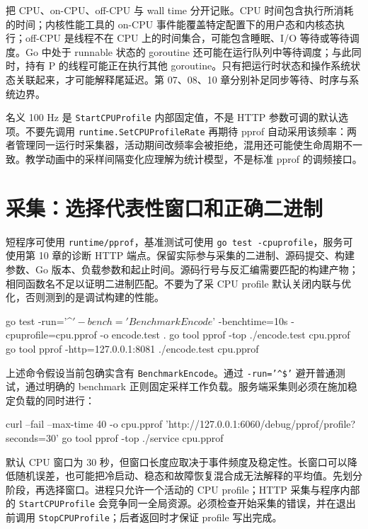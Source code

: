 \documentclass[UTF8,fontset=fandol,openany,11pt]{ctexbook}
\begin{document}
把 CPU、on-CPU、off-CPU 与 wall time 分开记账。CPU 时间包含执行所消耗的时间；内核性能工具的 on-CPU 事件能覆盖特定配置下的用户态和内核态执行；off-CPU 是线程不在 CPU 上的时间集合，可能包含睡眠、I/O 等待或等待调度。Go 中处于 runnable 状态的 goroutine 还可能在运行队列中等待调度；与此同时，持有 P 的线程可能正在执行其他 goroutine。只有把运行时状态和操作系统状态关联起来，才可能解释尾延迟。第 07、08、10 章分别补足同步等待、时序与系统边界。

名义 100 Hz 是 \texttt{StartCPUPr\allowbreak{}ofile} 内部固定值，不是 HTTP 参数可调的默认选项。不要先调用 \texttt{runtime.\allowbreak{}SetCPUProf\allowbreak{}ileRate} 再期待 pprof 自动采用该频率：两者管理同一运行时采集器，活动期间改频率会被拒绝，混用还可能使生命周期不一致。教学动画中的采样间隔变化应理解为统计模型，不是标准 pprof 的调频接口。

\section{采集：选择代表性窗口和正确二进制}
短程序可使用 \texttt{runtime/\allowbreak{}pprof}，基准测试可使用 \texttt{go test -\allowbreak{}cpuprofile}，服务可使用第 10 章的诊断 HTTP 端点。保留实际参与采集的二进制、源码提交、构建参数、Go 版本、负载参数和起止时间。源码行号与反汇编需要匹配的构建产物；相同函数名不足以证明二进制匹配。不要为了采 CPU profile 默认关闭内联与优化，否则测到的是调试构建的性能。

\begin{codeblock}
go test -run='^$' -bench='BenchmarkEncode$' -benchtime=10s   -cpuprofile=cpu.pprof -o encode.test .
go tool pprof -top ./encode.test cpu.pprof
go tool pprof -http=127.0.0.1:8081 ./encode.test cpu.pprof
\end{codeblock}

上述命令假设当前包确实含有 \texttt{BenchmarkE\allowbreak{}ncode}。通过 \texttt{-\allowbreak{}run='\textasciicircum{}\$'} 避开普通测试，通过明确的 benchmark 正则固定采样工作负载。服务端采集则必须在施加稳定负载的同时进行：

\begin{codeblock}
curl --fail --max-time 40 -o cpu.pprof   'http://127.0.0.1:6060/debug/pprof/profile?seconds=30'
go tool pprof -top ./service cpu.pprof
\end{codeblock}

默认 CPU 窗口为 30 秒，但窗口长度应取决于事件频度及稳定性。长窗口可以降低随机误差，也可能把冷启动、稳态和故障恢复混合成无法解释的平均值。先划分阶段，再选择窗口。进程只允许一个活动的 CPU profile；HTTP 采集与程序内部的 \texttt{StartCPUPr\allowbreak{}ofile} 会竞争同一全局资源。必须检查开始采集的错误，并在退出前调用 \texttt{StopCPUPro\allowbreak{}file}；后者返回时才保证 profile 写出完成。\cite{tools-http-pprof}\cite{tools-pprof}
\end{document}
